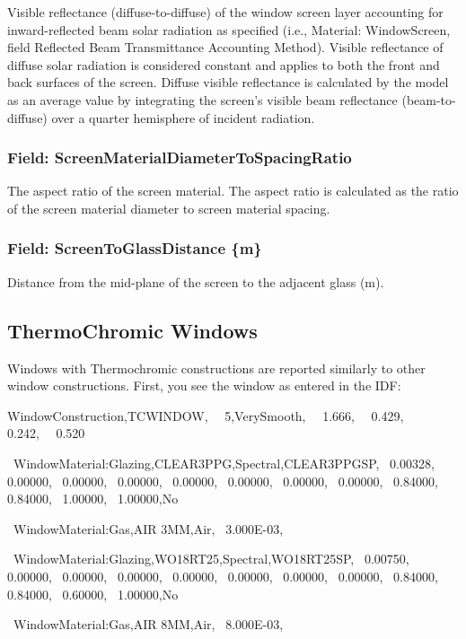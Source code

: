 Visible reflectance (diffuse-to-diffuse) of the window screen layer accounting for inward-reflected beam solar radiation as specified (i.e., Material: WindowScreen, field Reflected Beam Transmittance Accounting Method). Visible reflectance of diffuse solar radiation is considered constant and applies to both the front and back surfaces of the screen. Diffuse visible reflectance is calculated by the model as an average value by integrating the screen's visible beam reflectance (beam-to-diffuse) over a quarter hemisphere of incident radiation.

\subsubsection{Field: ScreenMaterialDiameterToSpacingRatio}\label{field-screenmaterialdiametertospacingratio}

The aspect ratio of the screen material. The aspect ratio is calculated as the ratio of the screen material diameter to screen material spacing.

\subsubsection{Field: ScreenToGlassDistance \{m\}}\label{field-screentoglassdistance-m}

Distance from the mid-plane of the screen to the adjacent glass (m).

\subsection{ThermoChromic Windows}\label{thermochromic-windows}

Windows with Thermochromic constructions are reported similarly to other window constructions. First, you see the window as entered in the IDF:

WindowConstruction,TCWINDOW,~~ 5,VerySmooth,~~ 1.666,~~ 0.429,~~ 0.242,~~ 0.520

~WindowMaterial:Glazing,CLEAR3PPG,Spectral,CLEAR3PPGSP,~ 0.00328,~ 0.00000,~ 0.00000,~ 0.00000,~ 0.00000,~ 0.00000,~ 0.00000,~ 0.00000,~ 0.84000,~ 0.84000,~ 1.00000,~ 1.00000,No

~WindowMaterial:Gas,AIR 3MM,Air,~ 3.000E-03,

~WindowMaterial:Glazing,WO18RT25,Spectral,WO18RT25SP,~ 0.00750,~ 0.00000,~ 0.00000,~ 0.00000,~ 0.00000,~ 0.00000,~ 0.00000,~ 0.00000,~ 0.84000,~ 0.84000,~ 0.60000,~ 1.00000,No

~WindowMaterial:Gas,AIR 8MM,Air,~ 8.000E-03,

